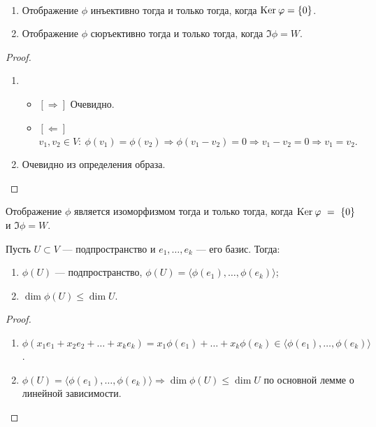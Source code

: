 \begin{Suggestion}\
    \begin{enumerate}
        \item Отображение $\phi$ инъективно тогда и только тогда, когда $\mathrm{Ker}\: \varphi = \{0\}$.
        \item Отображение $\phi$ сюръективно тогда и только тогда, когда $\Im \phi = W$.
    \end{enumerate} 
\end{Suggestion}

\begin{proof}\
    \begin{enumerate}
        \item \begin{itemize}
            \item $[\Rightarrow]$ Очевидно.
            \item $[\Leftarrow]$ $v_1, v_2 \in V :\ \phi(v_1)=\phi(v_2) \Rightarrow \phi (v_1 - v_2) = 0 \Rightarrow v_1 - v_2 = 0 \Rightarrow v_1 = v_2 $.
        \end{itemize}
        \item Очевидно из определения образа.
    \end{enumerate}
\end{proof}

\begin{Consequence}
    Отображение $\phi$ является изоморфизмом тогда и только тогда, когда $\mathrm{Ker}\: \varphi~=~\{0\}$ и $\Im \phi = W$.
\end{Consequence}

\begin{Suggestion}
    Пусть $U \subset V$ --- подпространство и $e_1, \ldots, e_k$ --- его базис. Тогда:
    \begin{enumerate}
        \item $\phi(U)$ --- подпространство, $\phi(U) = \langle \phi(e_1), \ldots, \phi(e_k)\rangle$;
        \item $\dim \phi(U) \leqslant \dim U$.
    \end{enumerate}
\end{Suggestion}

\begin{proof}\
    \begin{enumerate}
        \item $\phi(x_1e_1 + x_2e_2 + \ldots + x_ke_k) = x_1\phi(e_1) + \ldots + x_k\phi(e_k) \in \langle \phi(e_1), \ldots, \phi(e_k)\rangle$.
        \item $\phi(U) = \langle\phi(e_1), \ldots, \phi(e_k)\rangle \Rightarrow \dim \phi(U) \leqslant \dim U$ по основной лемме о линейной зависимости.
    \end{enumerate}
\end{proof}

